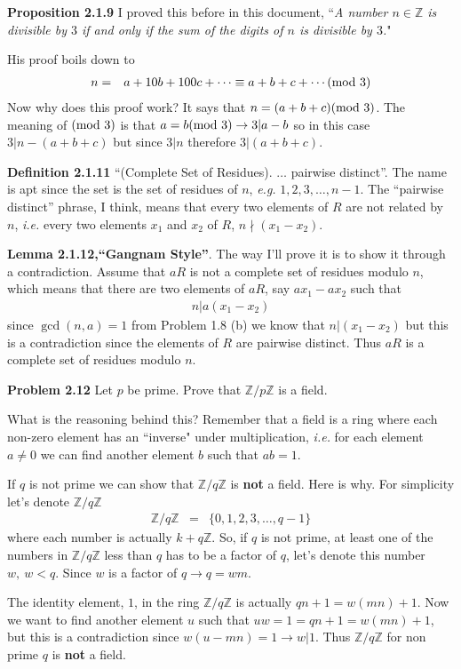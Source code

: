 \documentclass[aps,preprint,preprintnumbers,nofootinbib,showpacs,prd]{revtex4-1}
\newcommand{\ie}{{\it i.e.} }
\newcommand{\eg}{{\it e.g.} }
\newcommand{\nbea}{\begin{eqnarray*}}
\newcommand{\neea}{\end{eqnarray*}}
\begin{document}
{\bf Proposition 2.1.9} I proved this before in this document, ``{\it A number $n \in \mathbb{Z}$ is divisible by $3$ if and only if the sum of the digits of $n$ is divisible by $3$.}"

His proof boils down to
%
\nbea
n & = & a + 10b + 100c + \dots \equiv a +b+ c + \cdots ({\rm mod~} 3)
\neea
%
Now why does this proof work? It says that $n = (a+b+c)({\rm mod~} 3)$. The meaning of $({\rm mod~} 3)$ is that $a = b ({\rm mod~} 3) \to 3 | a-b$ so in this case $3 | n - (a+b+c)$ but since $3|n$ therefore $3|(a+b+c).$

{\bf Definition 2.1.11} ``(Complete Set of Residues). $\dots$ pairwise distinct''. The name is apt since the set is the set of residues of $n$, \eg $1,2,3,\dots,n-1$. The ``pairwise distinct'' phrase, I think, means that every two elements of $R$ are not related by $n$, \ie every two elements $x_1$ and $x_2$ of $R$, $n \nmid (x_1 - x_2)$.

{\bf Lemma 2.1.12,``Gangnam Style''}. The way I'll prove it is to show it through a contradiction. Assume that $aR$ is not a complete set of residues modulo $n$, which means that there are two elements of $aR$, say $ax_1 - ax_2$ such that
%
\nbea
n | a(x_1 - x_2)
\neea
%
since $\gcd(n,a) = 1$ from Problem 1.8 (b) we know that $n|(x_1 - x_2)$ but this is a contradiction since the elements of $R$ are pairwise distinct. Thus $aR$ is a complete set of residues modulo $n$.

{\bf Problem 2.12} Let $p$ be prime. Prove that $\mathbb{Z}/p\mathbb{Z}$ is a field.

What is the reasoning behind this? Remember that a field is a ring where each non-zero element has an ``inverse" under multiplication, \ie for each element $a \neq 0$ we can find another element $b$ such that $ab=1$.

If $q$ is not prime we can show that $\mathbb{Z}/q\mathbb{Z}$ is {\bf not} a field. Here is why. For simplicity let's denote $\mathbb{Z}/q\mathbb{Z}$
%
\nbea
\mathbb{Z}/q\mathbb{Z} & = & \{0,1,2,3, \dots, q-1\}
\neea
%
where each number is actually $k + q\mathbb{Z}$. So, if $q$ is not prime, at least one of the numbers in $\mathbb{Z}/q\mathbb{Z}$ less than $q$ has to be a factor of $q$, let's denote this number $w,~w < q$. Since $w$ is a factor of $q \to q = w m$.

The identity element, $1$, in the ring $\mathbb{Z}/q\mathbb{Z}$ is actually $qn + 1 = w(mn) + 1$. Now we want to find another element $u$ such that $uw = 1 = qn + 1 = w(mn) + 1$, but this is a contradiction since $w (u - mn) = 1 \to w|1$. Thus $\mathbb{Z}/q\mathbb{Z}$ for non prime $q$ is {\bf not} a field.
\end{document}
